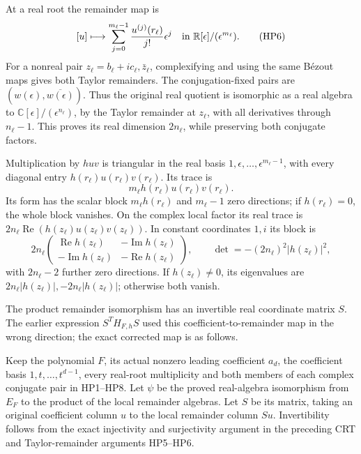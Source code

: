 \documentclass[
  11pt,
]{article}
\begin{document}
At a real root the remainder map is \[
[u]\longmapsto\sum_{j=0}^{m_\ell-1}
\frac{u^{(j)}(r_\ell)}{j!}\epsilon^j
\quad\hbox{in }\mathbb R[\epsilon]/(\epsilon^{m_\ell}).
\tag{HP6}
\] For a nonreal pair \(z_\ell=b_\ell+ic_\ell,\bar z_\ell\),
complexifying and using the same Bézout maps gives both Taylor
remainders. The conjugation-fixed pairs are
\((w(\epsilon),\overline{w(\epsilon)})\). Thus the original real
quotient is isomorphic as a real algebra to
\(\mathbb C[\epsilon]/(\epsilon^{n_\ell})\), by the Taylor remainder at
\(z_\ell\), with all derivatives through \(n_\ell-1\). This proves its
real dimension \(2n_\ell\), while preserving both conjugate factors.

Multiplication by \(huv\) is triangular in the real basis
\(1,\epsilon,\ldots,\epsilon^{m_\ell-1}\), with every diagonal entry
\(h(r_\ell)u(r_\ell)v(r_\ell)\). Its trace is \[
m_\ell h(r_\ell)u(r_\ell)v(r_\ell).
\tag{HP7}
\] Its form has the scalar block \(m_\ell h(r_\ell)\) and \(m_\ell-1\)
zero directions; if \(h(r_\ell)=0\), the whole block vanishes. On the
complex local factor its real trace is
\(2n_\ell\operatorname{Re}(h(z_\ell)u(z_\ell)v(z_\ell))\). In constant
coordinates \(1,i\) its block is \[
2n_\ell\begin{pmatrix}
\operatorname{Re}h(z_\ell)&-\operatorname{Im}h(z_\ell)\\
-\operatorname{Im}h(z_\ell)&-\operatorname{Re}h(z_\ell)
\end{pmatrix},
\qquad \det=-(2n_\ell)^2|h(z_\ell)|^2,
\tag{HP8}
\] with \(2n_\ell-2\) further zero directions. If \(h(z_\ell)\ne0\), its
eigenvalues are \(2n_\ell|h(z_\ell)|,-2n_\ell|h(z_\ell)|\); otherwise
both vanish.

The product remainder isomorphism has an invertible real coordinate
matrix \(S\). The earlier expression \(S^TH_{F,h}S\) used this
coefficient-to-remainder map in the wrong direction; the exact corrected
map is as follows.

Keep the polynomial \(F\), its actual nonzero leading coefficient
\(a_d\), the coefficient basis \(1,t,\ldots,t^{d-1}\), every real-root
multiplicity and both members of each complex conjugate pair in
HP1--HP8. Let \(\psi\) be the proved real-algebra isomorphism from
\(E_F\) to the product of the local remainder algebras. Let \(S\) be its
matrix, taking an original coefficient column \(u\) to the local
remainder column \(Su\). Invertibility follows from the exact
injectivity and surjectivity argument in the preceding CRT and
Taylor-remainder arguments HP5--HP6.
\end{document}
